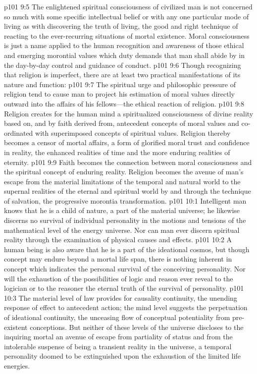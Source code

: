 \vs p101 9:5 The enlightened spiritual consciousness of civilized man is not concerned so much with some specific intellectual belief or with any one particular mode of living as with discovering the truth of living, the good and right technique of reacting to the ever\hyp{}recurring situations of mortal existence. Moral consciousness is just a name applied to the human recognition and awareness of those ethical and emerging morontial values which duty demands that man shall abide by in the day\hyp{}by\hyp{}day control and guidance of conduct.
\pc \vs p101 9:6 Though recognizing that religion is imperfect, there are at least two practical manifestations of its nature and function:
\pc \vs p101 9:7 \bibnobreakspace The spiritual urge and philosophic pressure of religion tend to cause man to project his estimation of moral values directly outward into the affairs of his fellows---the ethical reaction of religion.
\pc \vs p101 9:8 \bibnobreakspace Religion creates for the human mind a spiritualized consciousness of divine reality based on, and by faith derived from, antecedent concepts of moral values and co\hyp{}ordinated with superimposed concepts of spiritual values. Religion thereby becomes a censor of mortal affairs, a form of glorified moral trust and confidence in reality, the enhanced realities of time and the more enduring realities of eternity.
\pc \vs p101 9:9 Faith becomes the connection between moral consciousness and the spiritual concept of enduring reality. Religion becomes the avenue of man’s escape from the material limitations of the temporal and natural world to the supernal realities of the eternal and spiritual world by and through the technique of salvation, the progressive morontia transformation.
\vs p101 10:1 Intelligent man knows that he is a child of nature, a part of the material universe; he likewise discerns no survival of individual personality in the motions and tensions of the mathematical level of the energy universe. Nor can man ever discern spiritual reality through the examination of physical causes and effects.
\vs p101 10:2 A human being is also aware that he is a part of the ideational cosmos, but though concept may endure beyond a mortal life span, there is nothing inherent in concept which indicates the personal survival of the conceiving personality. Nor will the exhaustion of the possibilities of logic and reason ever reveal to the logician or to the reasoner the eternal truth of the survival of personality.
\vs p101 10:3 The material level of law provides for causality continuity, the unending response of effect to antecedent action; the mind level suggests the perpetuation of ideational continuity, the unceasing flow of conceptual potentiality from pre\hyp{}existent conceptions. But neither of these levels of the universe discloses to the inquiring mortal an avenue of escape from partiality of status and from the intolerable suspense of being a transient reality in the universe, a temporal personality doomed to be extinguished upon the exhaustion of the limited life energies.
